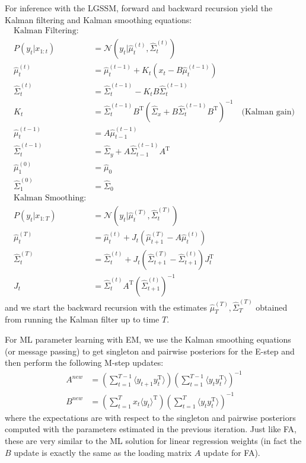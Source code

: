 \documentclass[a4paper]{article}
\begin{document}
For inference with the LGSSM, forward and backward recursion yield the Kalman filtering and Kalman smoothing equations:
\begin{align*}
\text{Kalman Filtering:}& \\
P(y_t|x_{1:t}) &= \mathcal{N}(y_t|\hat{\mu}_t^{(t)},\hat{\Sigma}_t^{(t)}) \\
\hat{\mu}_t^{(t)} &= \hat{\mu}_t^{(t-1)} + K_t(x_t - B\hat{\mu}_t^{(t-1)}) \\
\hat{\Sigma}_t^{(t)} &= \hat{\Sigma}_t^{(t-1)} - K_tB\hat{\Sigma}_t^{(t-1)}\\
K_t &= \hat{\Sigma}_t^{(t-1)}B^\textrm{T}(\hat{\Sigma}_x + B\hat{\Sigma}_t^{(t-1)}B^\textrm{T})^{-1} \quad\text{(Kalman gain)} \\
\hat{\mu}_t^{(t-1)} &= A\hat{\mu}_{t-1}^{(t-1)} \\
\hat{\Sigma}_t^{(t-1)} &= \hat{\Sigma}_y + A\hat{\Sigma}_{t-1}^{(t-1)}A^\textrm{T} \\
\hat{\mu}_1^{(0)} &= \hat{\mu}_0 \\
\hat{\Sigma}_1^{(0)} &= \hat{\Sigma}_0 \\
\text{Kalman Smoothing:}& \\
P(y_t|x_{1:T}) &= \mathcal{N}(y_t|\hat{\mu}_t^{(T)},\hat{\Sigma}_t^{(T)}) \\
\hat{\mu}_t^{(T)} &= \hat{\mu}_t^{(t)} + J_t(\hat{\mu}_{t+1}^{(T)} - A\hat{\mu}_t^{(t)}) \\
\hat{\Sigma}_t^{(T)} &= \hat{\Sigma}_t^{(t)} + J_t(\hat{\Sigma}_{t+1}^{(T)} - \hat{\Sigma}_{t+1}^{(t)})J_t^\textrm{T} \\
J_t &= \hat{\Sigma}_t^{(t)}A^\textrm{T}(\hat{\Sigma}_{t+1}^{(t)})^{-1}
\end{align*}
and we start the backward recursion with the estimates $\hat{\mu}_T^{(T)},\hat{\Sigma}_T^{(T)}$ obtained from running the Kalman filter up to time $T$.

For ML parameter learning with EM, we use the Kalman smoothing equations (or message passing) to get singleton and pairwise posteriors for the E-step and then perform the following M-step updates:
\begin{align*}
A^{new} &= \left(\sum_{t=1}^{T-1} \langle y_{t+1} y_t^\textrm{T} \rangle\right)\left(\sum_{t=1}^{T-1} \langle y_t y_t^\textrm{T} \rangle\right)^{-1} \\
B^{new} &= \left(\sum_{t=1}^T x_t \langle y_t\rangle^\textrm{T} \right)\left(\sum_{t=1}^T \langle y_t y_t^\textrm{T} \rangle\right)^{-1}
\end{align*}
where the expectations are with respect to the singleton and pairwise posteriors computed with the parameters estimated in the previous iteration. Just like FA, these are very similar to the ML solution for linear regression weights (in fact the $B$ update is exactly the same as the loading matrix $A$ update for FA).
\end{document}
